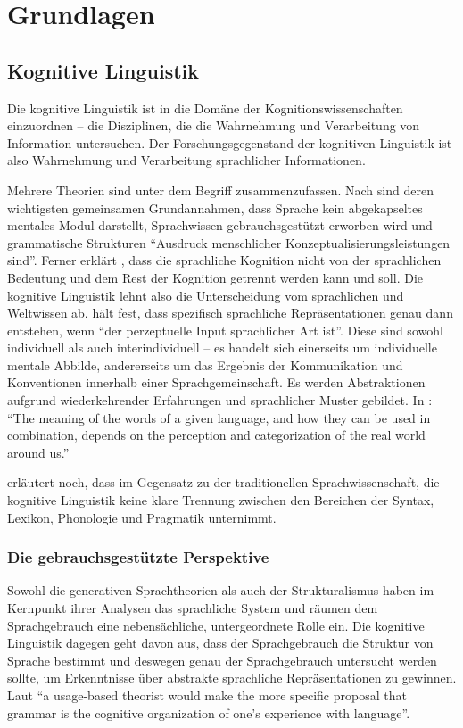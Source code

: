 \section{Grundlagen}

\subsection{Kognitive Linguistik}

Die kognitive Linguistik ist in die Domäne der Kognitionswissenschaften einzuordnen -- die Disziplinen, die die Wahrnehmung und Verarbeitung von Information untersuchen.
Der Forschungsgegenstand der kognitiven Linguistik ist also Wahrnehmung und Verarbeitung sprachlicher Informationen.

Mehrere Theorien sind unter dem Begriff zusammenzufassen.
Nach \cite{Ziem13} sind deren wichtigsten gemeinsamen Grundannahmen, dass Sprache kein abgekapseltes mentales Modul darstellt, Sprachwissen gebrauchsgestützt erworben wird und grammatische Strukturen ``Ausdruck menschlicher Konzeptualisierungsleistungen sind''.
Ferner erklärt \cite{Ellis08}, dass die sprachliche Kognition nicht von der sprachlichen Bedeutung und dem Rest der Kognition getrennt werden kann und soll.
Die kognitive Linguistik lehnt also die Unterscheidung vom sprachlichen und Weltwissen ab.
\cite{Ziem08} hält fest, dass spezifisch sprachliche Repräsentationen genau dann entstehen, wenn ``der perzeptuelle Input sprachlicher Art ist''.
Diese sind sowohl individuell als auch interindividuell -- es handelt sich einerseits um individuelle mentale Abbilde, andererseits um das Ergebnis der Kommunikation und Konventionen innerhalb einer Sprachgemeinschaft.
Es werden Abstraktionen aufgrund wiederkehrender Erfahrungen und sprachlicher Muster gebildet.
In \cite{Ellis08}: ``The meaning of the words of a given language, and how they can be used in combination, depends on the perception and categorization of the real world around us.''

\cite{Ellis08} erläutert noch, dass im Gegensatz zu der traditionellen Sprachwissenschaft, die kognitive Linguistik keine klare Trennung zwischen den Bereichen der Syntax, Lexikon, Phonologie und Pragmatik unternimmt.

\subsubsection{Die gebrauchsgestützte Perspektive}
Sowohl die generativen Sprachtheorien als auch der Strukturalismus haben im Kernpunkt ihrer Analysen das sprachliche System und räumen dem Sprachgebrauch eine nebensächliche, untergeordnete Rolle ein.
Die kognitive Linguistik dagegen geht davon aus, dass der Sprachgebrauch die Struktur von Sprache bestimmt und deswegen genau der Sprachgebrauch untersucht werden sollte, um Erkenntnisse über abstrakte sprachliche Repräsentationen zu gewinnen.
Laut \cite{Bybee06} ``a usage-based theorist would make the more specific proposal that grammar is the cognitive organization of one’s experience with language''.

